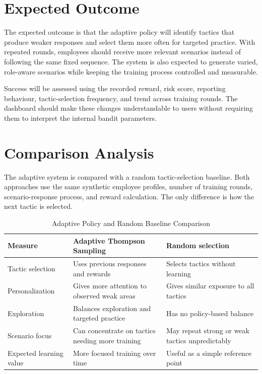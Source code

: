 \documentclass[12pt,a4paper]{article}
\begin{document}

\section{Expected Outcome}

The expected outcome is that the adaptive policy will identify tactics
that produce weaker responses and select them more often for targeted
practice. With repeated rounds, employees should receive more relevant
scenarios instead of following the same fixed sequence. The system is
also expected to generate varied, role-aware scenarios while keeping
the training process controlled and measurable.

Success will be assessed using the recorded reward, risk score,
reporting behaviour, tactic-selection frequency, and trend across
training rounds. The dashboard should make these changes understandable
to users without requiring them to interpret the internal bandit
parameters.



\section{Comparison Analysis}

The adaptive system is compared with a random tactic-selection
baseline. Both approaches use the same synthetic employee profiles,
number of training rounds, scenario-response process, and reward
calculation. The only difference is how the next tactic is selected.

\begin{table}[H]
\centering
\caption{Adaptive Policy and Random Baseline Comparison}
\label{tab:comparison}
\begin{tabularx}{\textwidth}{@{}lXX@{}}
\toprule
\textbf{Measure} & \textbf{Adaptive Thompson Sampling} & \textbf{Random selection} \\
\midrule
Tactic selection & Uses previous responses and rewards & Selects tactics without learning \\
Personalization & Gives more attention to observed weak areas & Gives similar exposure to all tactics \\
Exploration & Balances exploration and targeted practice & Has no policy-based balance \\
Scenario focus & Can concentrate on tactics needing more training & May repeat strong or weak tactics unpredictably \\
Expected learning value & More focused training over time & Useful as a simple reference point \\
\bottomrule
\end{tabularx}
\end{table}
\end{document}
